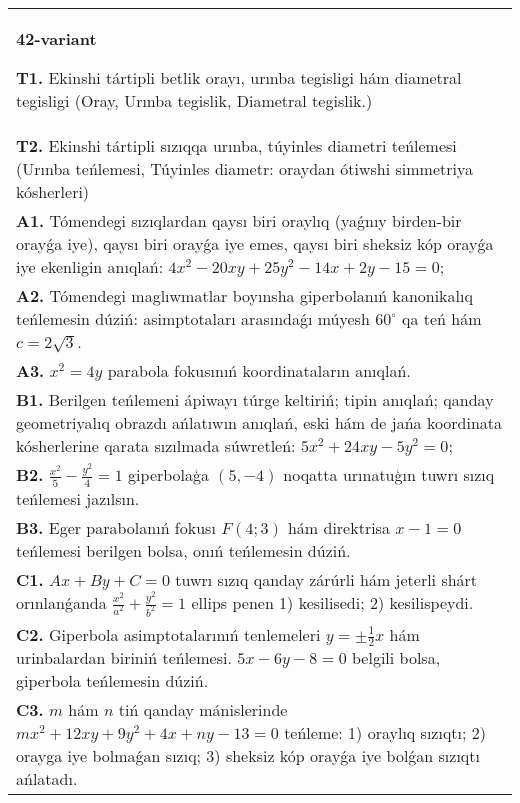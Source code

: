 \documentclass{article}
\begin{document}
\begin{tabular}{m{17cm}}
\textbf{42-variant}
\newline

\textbf{T1.} Ekinshi tártipli betlik orayı, urınba tegisligi hám diametral tegisligi (Oray, Urınba tegislik, Diametral tegislik.) \\
\textbf{T2.} Ekinshi tártipli sızıqqa urınba, túyinles diametri teńlemesi (Urınba teńlemesi, Túyinles diametr: oraydan ótiwshi simmetriya kósherleri) \\
\textbf{A1.} Tómendegi sızıqlardan qaysı biri oraylıq (yaǵnıy birden-bir orayǵa iye), qaysı biri orayǵa iye emes, qaysı biri sheksiz kóp orayǵa iye ekenligin anıqlań: $4 x^2-20 x y+25 y^2-14 x+2 y-15=0$; \\
\textbf{A2.} Tómendegi maglıwmatlar boyınsha giperbolanıń kanonikalıq teńlemesin dúziń: asimptotaları arasındaǵı múyesh $60^{\circ}$ qa teń hám $c=2 \sqrt{3}$. \\
\textbf{A3.} $x^2=4 y$ parabola fokusınıń koordinataların anıqlań. \\
\textbf{B1.} Berilgen teńlemeni ápiwayı túrge keltiriń; tipin anıqlań; qanday geometriyalıq obrazdı ańlatıwın anıqlań, eski hám de jańa koordinata kósherlerine qarata sızılmada súwretleń:  $5 x^2+24 x y-5 y^2=0$; \\
\textbf{B2.} $\frac{x^2}{5}-\frac{y^2}{4}=1$ giperbolaģa $ (5,-4) $ noqatta urınatuģın tuwrı sızıq teńlemesi jazılsın. \\
\textbf{B3.} Eger parabolanıń fokusı $F (4;3) $ hám direktrisa $x-1=0$ teńlemesi berilgen bolsa, onıń teńlemesin dúziń. \\
\textbf{C1.} $A x+B y+C=0$ tuwrı sızıq qanday zárúrli hám jeterli shárt orınlanǵanda $\frac{x^2}{a^2}+\frac{y^2}{b^2}=1$ ellips penen 1) kesilisedi; 2) kesilispeydi. \\
\textbf{C2.} Giperbola asimptotalarınıń tenlemeleri $y= \pm \frac{1}{2} x$ hám urinbalardan biriniń teńlemesi. $5 x-6 y-8=0$ belgili bolsa, giperbola teńlemesin dúziń. \\
\textbf{C3.} $m$ hám $n$ tiń qanday mánislerinde $m x^2+12 x y+9 y^2+4 x+n y-13=0$ teńleme: 1) oraylıq sızıqtı; 2) orayga iye bolmaǵan sızıq; 3) sheksiz kóp orayǵa iye bolǵan sızıqtı ańlatadı. \\

\end{tabular}
\vspace{1cm}
\end{document}
